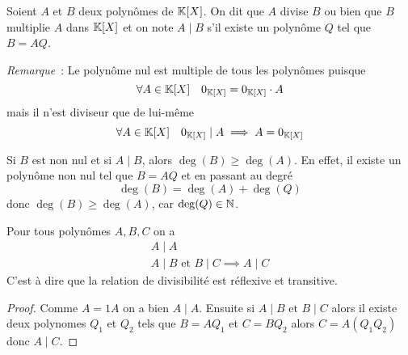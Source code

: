 \begin{defdef}
  Soient \(A\) et \(B\) deux polynômes de \(\mathbb{K}[X]\). On dit que \(A\) divise \(B\) ou bien que \(B\) multiplie \(A\) dans \(\mathbb{K}[X]\) et on note \(A\mid{}B\) s'il existe un polynôme \(Q\) tel que \(B=AQ\).
\end{defdef}

\emph{Remarque}~: Le polynôme nul est multiple de tous les polynômes puisque
\begin{equation}
  \forall A \in \mathbb{K}[X] \quad 0_{\mathbb{K}[X]} = 0_{\mathbb{K}[X]} \cdot A
\end{equation}
mais il n'est diviseur que de lui-même
\begin{equation}
  \forall A \in \mathbb{K}[X] \quad 0_{\mathbb{K}[X]}\mid{}A \implies A=0_{\mathbb{K}[X]}
\end{equation}

Si \(B\) est non nul et si \(A\mid{}B\), alors \(\deg(B) \geqslant \deg(A)\). En effet, il existe un polynôme non nul tel que \(B=AQ\) et en passant au degré
\begin{equation}
  \deg(B) = \deg(A)+\deg(Q)
\end{equation}
donc \(\deg(B) \geqslant \deg(A)\), car \(\deg(Q)\in \mathbb{N}\).

\begin{prop}
  Pour tous polynômes \(A,B,C\) on a
  \begin{align}
    A\mid{}A \\
    A\mid{}B \text{~et~} B\mid{}C \implies A\mid{}C
  \end{align}
C'est à dire que la relation de divisibilité est réflexive et transitive.
\end{prop}
\begin{proof}
  Comme \(A=1 A\) on a bien \(A\mid{}A\). Ensuite si \(A\mid{}B \text{~et~} B\mid{}C\) alors il existe deux polynomes \(Q_1\) et \(Q_2\) tels que \(B=AQ_1\) et \(C=BQ_2\) alors \(C=A(Q_1Q_2)\) donc \(A\mid{}C\).
\end{proof}

